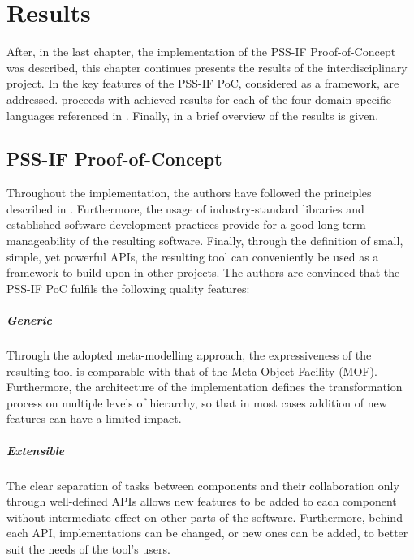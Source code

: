 \chapter{Results}
\label{chap:results}

After, in the last chapter, the implementation of the PSS-IF Proof-of-Concept was described, this chapter continues presents the results of the interdisciplinary project. In  the key features of the PSS-IF PoC, considered as a framework, are addressed.  proceeds with achieved results for each of the four domain-specific languages referenced in . Finally, in  a brief overview of the results is given.

\section{PSS-IF Proof-of-Concept}
\label{sec:results:framework}

Throughout the implementation, the authors have followed the principles described in . Furthermore, the usage of industry-standard libraries and established software-development practices provide for a good long-term manageability of the resulting software. Finally, through the definition of small, simple, yet powerful APIs, the resulting tool can conveniently be used as a framework to build upon in other projects. The authors are convinced that the PSS-IF PoC fulfils the following quality features:

\paragraph{Generic} Through the adopted meta-modelling approach, the expressiveness of the resulting tool is comparable with that of the Meta-Object Facility (MOF). Furthermore, the architecture of the implementation defines the transformation process on multiple levels of hierarchy, so that in most cases addition of new features can have a limited impact.

\paragraph{Extensible} The clear separation of tasks between components and their collaboration only through well-defined APIs allows new features to be added to each component without intermediate effect on other parts of the software. Furthermore, behind each API, implementations can be changed, or new ones can be added, to better suit the needs of the tool's users.

